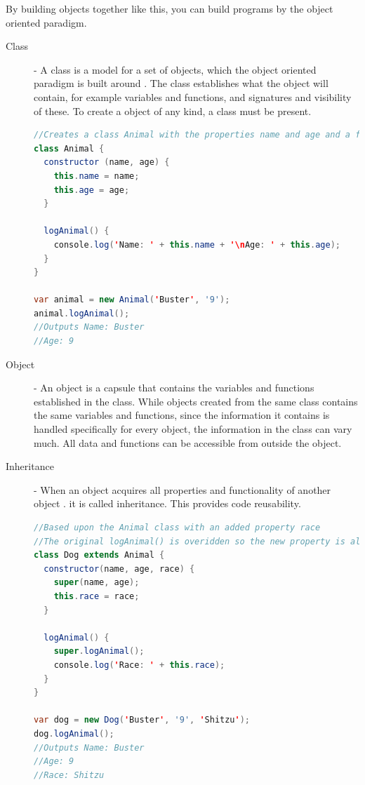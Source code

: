 \documentclass {article}
\begin{document}
By building objects together like this, you can build programs by the object oriented paradigm.  

\begin{description}
\item [Class] - A class is a model for a set of objects, which the object oriented paradigm is built around \cite{gabmar}. The class establishes what the object will contain, for example variables and functions, and signatures and visibility of these. To create a object of any kind, a class must be present. 

\begin{lstlisting}[language=Java]
//Creates a class Animal with the properties name and age and a function for logging the properties to the screen
class Animal {
  constructor (name, age) {
    this.name = name;
    this.age = age;
  }

  logAnimal() {
    console.log('Name: ' + this.name + '\nAge: ' + this.age);
  }
}

var animal = new Animal('Buster', '9');
animal.logAnimal();
//Outputs Name: Buster
//Age: 9
\end{lstlisting}

\item [Object] - An object is a capsule that contains the variables and functions established in the class\cite{}. While objects created from the same class contains the same variables and functions, since the information it contains is handled specifically for every object, the information in the class can vary much. All data and functions can be accessible from outside the object. 

\item [Inheritance] - When an object acquires all properties and functionality of another object \cite{skansholm}. it is called inheritance. This provides code reusability. 

\begin{lstlisting}[language=Java, breaklines=true]
//Based upon the Animal class with an added property race
//The original logAnimal() is overidden so the new property is also logged to the screen.
class Dog extends Animal {
  constructor(name, age, race) {
    super(name, age);
    this.race = race;
  }

  logAnimal() {
    super.logAnimal();
    console.log('Race: ' + this.race);
  }
}

var dog = new Dog('Buster', '9', 'Shitzu');
dog.logAnimal();
//Outputs Name: Buster
//Age: 9
//Race: Shitzu
\end{lstlisting}


\end{description}
\end{document}
